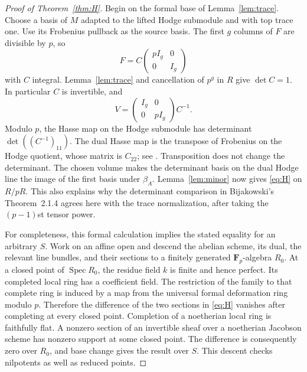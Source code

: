 \documentclass[11pt]{article}
\theoremstyle{definition}\newtheorem{definition}[theorem]{Definition}
\theoremstyle{remark}\newtheorem{remark}[theorem]{Remark}
\newcommand{\FF}{\mathbf F}
\newcommand{\Spec}{\operatorname{Spec}}
\begin{document}
\begin{proof}[Proof of Theorem~\ref{thm:H}]
Begin on the formal base of Lemma~\ref{lem:trace}. Choose a basis of $M$ adapted to the lifted Hodge submodule and with top trace one. Use its Frobenius pullback as the source basis. The first $g$ columns of $F$ are divisible by $p$, so
\begin{equation}\label{eq:F-matrix}
 F=C\begin{pmatrix}pI_g&0\\0&I_g\end{pmatrix}
\end{equation}
with $C$ integral. Lemma~\ref{lem:trace} and cancellation of $p^g$ in $R$ give $\det C=1$. In particular $C$ is invertible, and
\begin{equation}\label{eq:V-matrix}
 V=\begin{pmatrix}I_g&0\\0&pI_g\end{pmatrix}C^{-1}.
\end{equation}
Modulo $p$, the Hasse map on the Hodge submodule has determinant $\det((C^{-1})_{11})$. The dual Hasse map is the transpose of Frobenius on the Hodge quotient, whose matrix is $C_{22}$; see \citet[Lemma~2.1.2, p.~11]{Bijakowski}. Transposition does not change the determinant. The chosen volume makes the determinant basis on the dual Hodge line the image of the first basis under $\beta_A$. Lemma~\ref{lem:minor} now gives \eqref{eq:H} on $R/pR$. This also explains why the determinant comparison in Bijakowski's Theorem~2.1.4 agrees here with the trace normalization, after taking the $(p-1)$st tensor power.

For completeness, this formal calculation implies the stated equality for an arbitrary $S$. Work on an affine open and descend the abelian scheme, its dual, the relevant line bundles, and their sections to a finitely generated $\FF_p$-algebra $R_0$. At a closed point of $\Spec R_0$, the residue field $k$ is finite and hence perfect. Its completed local ring has a coefficient field. The restriction of the family to that complete ring is induced by a map from the universal formal deformation ring modulo $p$. Therefore the difference of the two sections in \eqref{eq:H} vanishes after completing at every closed point. Completion of a noetherian local ring is faithfully flat. A nonzero section of an invertible sheaf over a noetherian Jacobson scheme has nonzero support at some closed point. The difference is consequently zero over $R_0$, and base change gives the result over $S$. This descent checks nilpotents as well as reduced points.
\end{proof}
\end{document}
